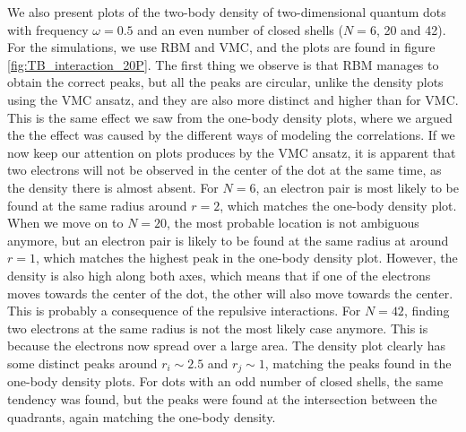 We also present plots of the two-body density of two-dimensional quantum dots with frequency $\omega=0.5$ and an even number of closed shells ($N=6$, 20 and 42). For the simulations, we use RBM and VMC, and the plots are found in figure \eqref{fig:TB_interaction_20P}. The first thing we observe is that RBM manages to obtain the correct peaks, but all the peaks are circular, unlike the density plots using the VMC ansatz, and they are also more distinct and higher than for VMC. This is the same effect we saw from the one-body density plots, where we argued the the effect was caused by the different ways of modeling the correlations. If we now keep our attention on plots produces by the VMC ansatz, it is apparent that two electrons will not be observed in the center of the dot at the same time, as the density there is almost absent. For $N=6$, an electron pair is most likely to be found at the same radius around $r=2$, which matches the one-body density plot. When we move on to $N=20$, the most probable location is not ambiguous anymore, but an electron pair is likely to be found at the same radius at around $r=1$, which matches the highest peak in the one-body density plot. However, the density is also high along both axes, which means that if one of the electrons moves towards the center of the dot, the other will also move towards the center. This is probably a consequence of the repulsive interactions. For $N=42$, finding two electrons at the same radius is not the most likely case anymore. This is because the electrons now spread over a large area. The density plot clearly has some distinct peaks around $r_i\sim 2.5$ and $r_j\sim 1$, matching the peaks found in the one-body density plots. For dots with an odd number of closed shells, the same tendency was found, but the peaks were found at the intersection between the quadrants, again matching the one-body density.

